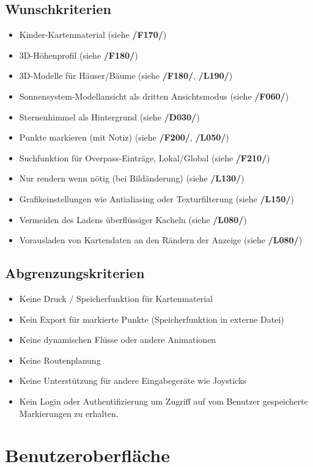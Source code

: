 \documentclass[10pt]{scrreprt}
\begin{document}
\section{Wunschkriterien}
\begin{itemize}
\item Kinder-Kartenmaterial (siehe \textbf{/F170/})
\item 3D-Höhenprofil (siehe \textbf{/F180/})
\item 3D-Modelle für Häuser/Bäume (siehe \textbf{/F180/}, \textbf{/L190/})
\item Sonnensystem-Modellansicht als dritten Ansichtsmodus (siehe \textbf{/F060/})
\item Sternenhimmel als Hintergrund (siehe \textbf{/D030/})
\item Punkte markieren (mit Notiz) (siehe \textbf{/F200/}, \textbf{/L050/})
\item Suchfunktion für Overpass-Einträge, Lokal/Global (siehe \textbf{/F210/})
\item Nur rendern wenn nötig (bei Bildänderung) (siehe \textbf{/L130/})
\item Grafikeinstellungen wie Antialiasing oder Texturfilterung (siehe \textbf{/L150/})
\item Vermeiden des Ladens überflüssiger Kacheln (siehe \textbf{/L080/})
\item Vorausladen von Kartendaten an den Rändern der Anzeige (siehe \textbf{/L080/})
\end{itemize}

\section{Abgrenzungskriterien}
\begin{itemize}
\item Keine Druck / Speicherfunktion für Kartenmaterial
\item Kein Export für markierte Punkte (Speicherfunktion in externe Datei)
\item Keine dynamischen Flüsse oder andere Animationen
\item Keine Routenplanung
\item Keine Unterstützung für andere Eingabegeräte wie Joysticks
\item Kein Login oder Authentifizierung um Zugriff auf vom Benutzer gespeicherte Markierungen zu erhalten.
\end{itemize}


\chapter{Benutzeroberfläche}
\end{document}
